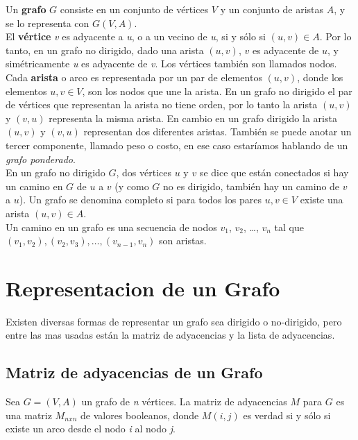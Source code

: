       Un \textbf{grafo} $G$ consiste en un conjunto de vértices $V$ y un conjunto de aristas $A$, y se lo representa con $G(V,A)$.\\

      El \textbf{vértice} \emph{v} es adyacente a \emph{u}, o a un vecino de \emph{u}, si y sólo si $(u,v) \in A$. Por lo tanto, en un grafo no dirigido, dado una arista $(u,v)$, $v$ es adyacente de $u$, y simétricamente \emph{u} es adyacente de \emph{v}.
      Los vértices también son llamados nodos. \\

      Cada \textbf{arista} o arco es representada por un par de elementos $(u,v)$, donde los elementos $u,v \in V$, son los nodos que une la arista.
      En un grafo no dirigido el par de vértices que representan la arista no tiene orden, por lo tanto la arista $(u,v)$ y $(v,u)$ representa la misma arista. En cambio en un grafo dirigido la arista $(u,v)$ y $(v,u)$ representan dos diferentes aristas. También se puede anotar un tercer componente, llamado peso o costo, en ese caso estaríamos hablando de un \emph{grafo ponderado}.\\

      En un grafo no dirigido $G$, dos vértices $u$ y $v$ se dice que están conectados si hay un camino en $G$ de $u$ a $v$ (y como $G$ no es dirigido, también hay un camino de $v$ a $u$). Un grafo  se denomina completo si para todos los pares $u,v \in V$ existe una arista $(u,v) \in A$.\\

      Un camino en un grafo es una secuencia de nodos $v_{1}$, $v_{2}$, \ldots{}, $v_n$ tal que $(v_{1}, v_{2}), (v_{2}, v_{3}), \ldots{}, (v_{n-1}, v_n)$ son aristas.
    \section{Representacion de un Grafo} %
    \label{sec:representacion_de_un_grafo}
      Existen diversas formas de representar un grafo sea dirigido o no-dirigido, pero entre las mas usadas están la matriz de adyacencias y la lista de adyacencias.

      \subsection{Matriz de adyacencias de un Grafo} %
      \label{sub:matriz_de_adyacencias_de_un_grafo}
        Sea $G = (V,A)$ un grafo de \emph{n} vértices. La matriz de adyacencias $M$  para $G$ es una matriz $M_{nxn}$ de valores booleanos, donde $M(i,j)$ es verdad si y sólo si existe un arco desde el nodo \emph{i} al nodo \emph{j}.

